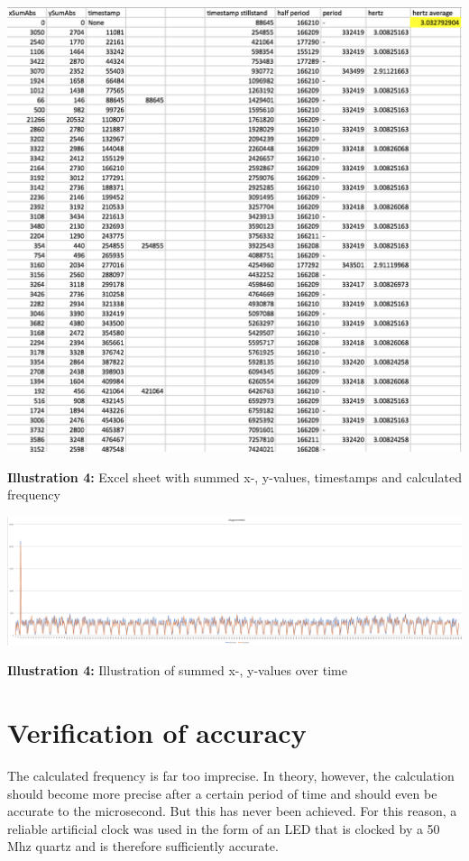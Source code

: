 \documentclass[12pt, a4paper]{report}
\begin{document}
\noindent
\begin{center}
\includegraphics[scale=0.4]{Images/excel_sheet_numbers.png}

{\bf Illustration 4:}  Excel sheet with summed x-, y-values, timestamps and calculated frequency\end{center}

\bigskip

\noindent
\begin{center}
\includegraphics[scale=0.3]{Images/excel_sheet_graph.png}

{\bf Illustration 4:} Illustration of summed x-, y-values over time\end{center}

\section{Verification of accuracy}
The calculated frequency is far too imprecise. In theory, however, the calculation should become more precise after a certain period of time and should even be accurate to the microsecond.
But this has never been achieved. For this reason, a reliable artificial clock was used in the form of an LED that is clocked by a 50 Mhz quartz and is therefore sufficiently accurate.
\end{document}
